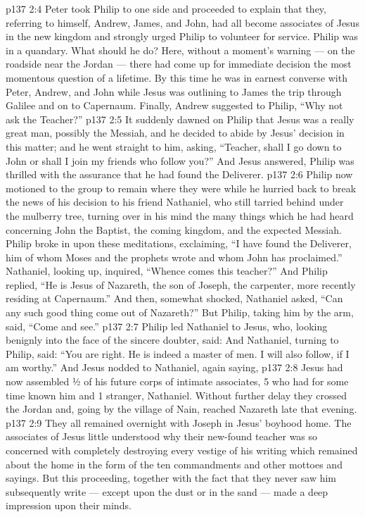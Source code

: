\vs p137 2:4 Peter took Philip to one side and proceeded to explain that they, referring to himself, Andrew, James, and John, had all become associates of Jesus in the new kingdom and strongly urged Philip to volunteer for service. Philip was in a quandary. What should he do? Here, without a moment’s warning --- on the roadside near the Jordan --- there had come up for immediate decision the most momentous question of a lifetime. By this time he was in earnest converse with Peter, Andrew, and John while Jesus was outlining to James the trip through Galilee and on to Capernaum. Finally, Andrew suggested to Philip, “Why not ask the Teacher?”
\vs p137 2:5 It suddenly dawned on Philip that Jesus was a really great man, possibly the Messiah, and he decided to abide by Jesus’ decision in this matter; and he went straight to him, asking, “Teacher, shall I go down to John or shall I join my friends who follow you?” And Jesus answered,  Philip was thrilled with the assurance that he had found the Deliverer.
\vs p137 2:6 \pc Philip now motioned to the group to remain where they were while he hurried back to break the news of his decision to his friend Nathaniel, who still tarried behind under the mulberry tree, turning over in his mind the many things which he had heard concerning John the Baptist, the coming kingdom, and the expected Messiah. Philip broke in upon these meditations, exclaiming, “I have found the Deliverer, him of whom Moses and the prophets wrote and whom John has proclaimed.” Nathaniel, looking up, inquired, “Whence comes this teacher?” And Philip replied, “He is Jesus of Nazareth, the son of Joseph, the carpenter, more recently residing at Capernaum.” And then, somewhat shocked, Nathaniel asked, “Can any such good thing come out of Nazareth?” But Philip, taking him by the arm, said, “Come and see.”
\vs p137 2:7 Philip led Nathaniel to Jesus, who, looking benignly into the face of the sincere doubter, said:  And Nathaniel, turning to Philip, said: “You are right. He is indeed a master of men. I will also follow, if I am worthy.” And Jesus nodded to Nathaniel, again saying, 
\vs p137 2:8 \pc Jesus had now assembled ½ of his future corps of intimate associates, 5 who had for some time known him and 1 stranger, Nathaniel. Without further delay they crossed the Jordan and, going by the village of Nain, reached Nazareth late that evening.
\vs p137 2:9 They all remained overnight with Joseph in Jesus’ boyhood home. The associates of Jesus little understood why their new\hyp{}found teacher was so concerned with completely destroying every vestige of his writing which remained about the home in the form of the ten commandments and other mottoes and sayings. But this proceeding, together with the fact that they never saw him subsequently write --- except upon the dust or in the sand --- made a deep impression upon their minds.
